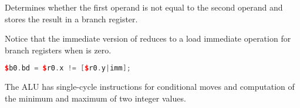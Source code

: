 \noindent Determines whether the first operand is not equal to the second operand and
stores the result in a branch register.

Notice that the immediate version of  reduces to a load immediate
operation for branch registers when  is zero.

\begin{lstlisting}[numbers=none, basicstyle=\ttfamily\footnotesize, language=C++]
$b0.bd = $r0.x != [$r0.y|imm];
\end{lstlisting}

The \rvex{} ALU has single-cycle instructions for conditional moves and
computation of the minimum and maximum of two integer values.
\vskip 10pt
\noindent\begin{minipage}{\textwidth}
\label{opc:SLCT}
\noindent\textbf{\footnotesize\texttt{}}

\noindent\textbf{\footnotesize\texttt{}}


\end{minipage}
